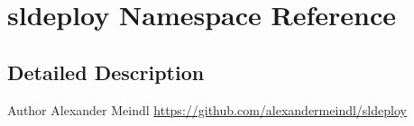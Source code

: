 \hypertarget{namespacesldeploy}{
\section{sldeploy Namespace Reference}
\label{namespacesldeploy}
}


\subsection{Detailed Description}
\begin{DoxyAuthor}{Author}
Alexander Meindl \hyperlink{}{https://github.com/alexandermeindl/sldeploy}
\end{DoxyAuthor}
